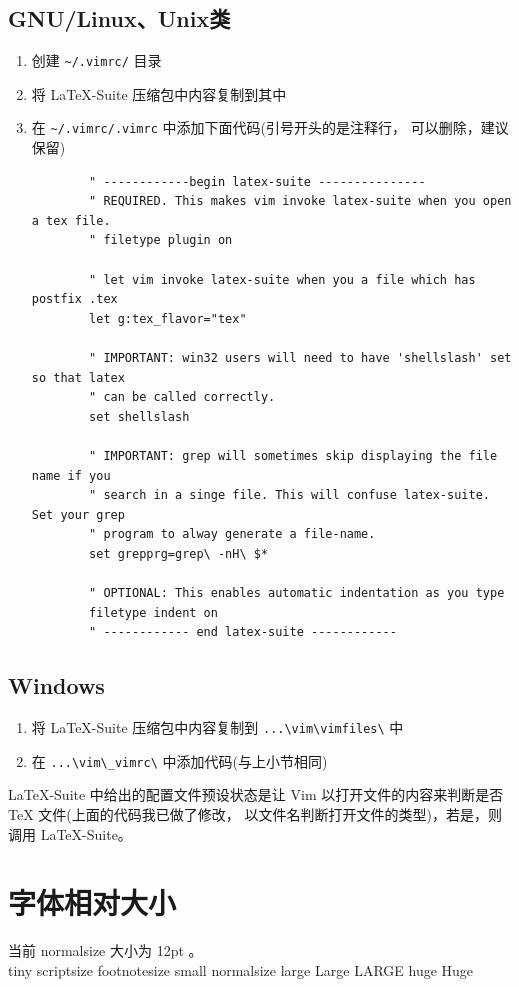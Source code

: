 \documentclass[a4paper,11pt]{article}
\begin{document}
\subsection{GNU/Linux、Unix类}
\begin{spacing}{1}
\begin{enumerate}
	\item 创建 \verb+~/.vimrc/+ 目录
	\item 将 \LaTeX{}-Suite 压缩包中内容复制到其中
	\item 在 \verb+~/.vimrc/.vimrc+ 中添加下面代码(引号开头的是注释行，
		可以删除，建议保留)\\
		{\footnotesize
		\begin{verbatim}
		" ------------begin latex-suite ---------------
		" REQUIRED. This makes vim invoke latex-suite when you open a tex file.
		" filetype plugin on

		" let vim invoke latex-suite when you a file which has postfix .tex
		let g:tex_flavor="tex"

		" IMPORTANT: win32 users will need to have 'shellslash' set so that latex
		" can be called correctly.
		set shellslash

		" IMPORTANT: grep will sometimes skip displaying the file name if you
		" search in a singe file. This will confuse latex-suite. Set your grep
		" program to alway generate a file-name.
		set grepprg=grep\ -nH\ $*

		" OPTIONAL: This enables automatic indentation as you type
		filetype indent on
		" ------------ end latex-suite ------------
		\end{verbatim}}
\end{enumerate}
\end{spacing}

\subsection{Windows}
\begin{enumerate}
	\item 将 \LaTeX{}-Suite 压缩包中内容复制到 \verb+...\vim\vimfiles\+ 中
	\item 在 \verb+...\vim\_vimrc\+ 中添加代码(与上小节相同)
\end{enumerate}

\LaTeX{}-Suite 中给出的配置文件预设状态是让 Vim
以打开文件的内容来判断是否 \TeX{} 文件(上面的代码我已做了修改，
以文件名判断打开文件的类型)，若是，则调用 \LaTeX{}-Suite。

\section{字体相对大小}
当前 normalsize 大小为 12pt 。\\
{\tiny tiny} {\scriptsize scriptsize} {\footnotesize footnotesize}
{\small small}
normalsize {\large large} {\Large Large} {\LARGE LARGE}
{\huge huge} {\Huge Huge}
\end{document}
